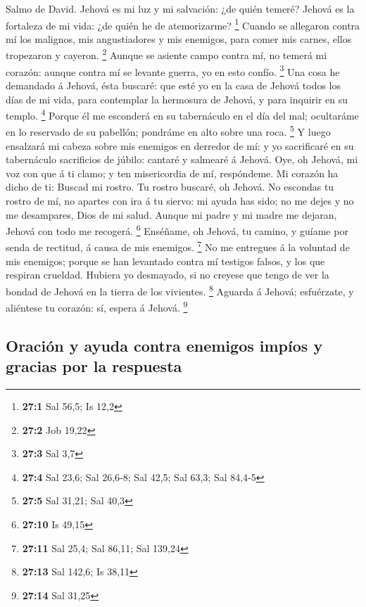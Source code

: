  Salmo de David. Jehová es mi luz y mi salvación: ¿de quién
temeré? Jehová es la fortaleza de mi vida: ¿de quién he de atemorizarme?
\footnote{\textbf{27:1} Sal 56,5; Is 12,2}  Cuando se
allegaron contra mí los malignos, mis angustiadores y mis enemigos, para
comer mis carnes, ellos tropezaron y cayeron. \footnote{\textbf{27:2}
  Job 19,22}  Aunque se asiente campo contra mí, no temerá
mi corazón: aunque contra mí se levante guerra, yo en esto confío.
\footnote{\textbf{27:3} Sal 3,7}  Una cosa he demandado á
Jehová, ésta buscaré: que esté yo en la casa de Jehová todos los días de
mi vida, para contemplar la hermosura de Jehová, y para inquirir en su
templo. \footnote{\textbf{27:4} Sal 23,6; Sal 26,6-8; Sal 42,5; Sal
  63,3; Sal 84,4-5}  Porque él me esconderá en su
tabernáculo en el día del mal; ocultaráme en lo reservado de su
pabellón; pondráme en alto sobre una roca. \footnote{\textbf{27:5} Sal
  31,21; Sal 40,3}  Y luego ensalzará mi cabeza sobre mis
enemigos en derredor de mí: y yo sacrificaré en su tabernáculo
sacrificios de júbilo: cantaré y salmearé á Jehová.  Oye, oh
Jehová, mi voz con que á ti clamo; y ten misericordia de mí, respóndeme.
 Mi corazón ha dicho de ti: Buscad mi rostro. Tu rostro
buscaré, oh Jehová.  No escondas tu rostro de mí, no apartes
con ira á tu siervo: mi ayuda has sido; no me dejes y no me desampares,
Dios de mi salud.  Aunque mi padre y mi madre me dejaran,
Jehová con todo me recogerá. \footnote{\textbf{27:10} Is 49,15}
 Enséñame, oh Jehová, tu camino, y guíame por senda de
rectitud, á causa de mis enemigos. \footnote{\textbf{27:11} Sal 25,4;
  Sal 86,11; Sal 139,24}  No me entregues á la voluntad de
mis enemigos; porque se han levantado contra mí testigos falsos, y los
que respiran crueldad.  Hubiera yo desmayado, si no creyese
que tengo de ver la bondad de Jehová en la tierra de los vivientes.
\footnote{\textbf{27:13} Sal 142,6; Is 38,11}  Aguarda á
Jehová; esfuérzate, y aliéntese tu corazón: sí, espera á Jehová.
\footnote{\textbf{27:14} Sal 31,25}

\hypertarget{oraciuxf3n-y-ayuda-contra-enemigos-impuxedos-y-gracias-por-la-respuesta}{%
\subsection{Oración y ayuda contra enemigos impíos y gracias por la
respuesta}\label{oraciuxf3n-y-ayuda-contra-enemigos-impuxedos-y-gracias-por-la-respuesta}}

